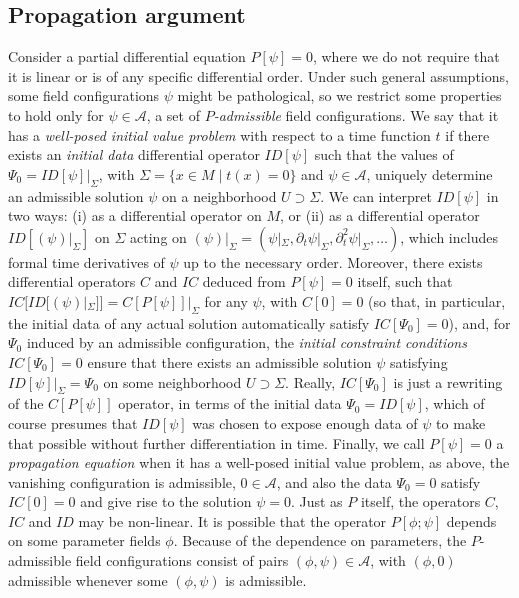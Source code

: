 \documentclass[a4paper]{article}
\theoremstyle{remark}
\newcommand{\del}{\partial}
\begin{document}
\subsection{Propagation argument} \label{sec:propeq}

Consider a partial differential equation $P[\psi] = 0$, where we do not
require that it is linear or is of any specific differential order.
Under such general assumptions, some field configurations $\psi$ might
be pathological, so we restrict some properties to hold only for $\psi
\in \mathcal{A}$, a set of \emph{$P$-admissible} field configurations.
We say that it has a \emph{well-posed initial value problem} with
respect to a time function $t$ if there exists an \emph{initial data}
differential operator $ID[\psi]$ such that the values of $\Psi_0 =
ID[\psi]|_\Sigma$, with $\Sigma = \{ x\in M \mid t(x) = 0 \}$ and $\psi
\in \mathcal{A}$, uniquely determine an admissible solution $\psi$ on a
neighborhood $U \supset \Sigma$. We can interpret $ID[\psi]$ in two
ways: (i) as a differential operator on $M$, or (ii) as a differential
operator $ID[(\psi)|_\Sigma]$ on $\Sigma$ acting on $(\psi)|_\Sigma =
(\psi|_\Sigma, \del_t \psi|_\Sigma, \del_t^2 \psi|_\Sigma, \ldots)$,
which includes formal time derivatives of $\psi$ up to the necessary
order. Moreover, there exists differential operators $C$ and $IC$
deduced from $P[\psi] = 0$ itself, such that $IC[ID[(\psi)|_\Sigma]] =
C[P[\psi]]|_\Sigma$ for any $\psi$, with $C[0] = 0$ (so that, in
particular, the initial data of any actual solution automatically
satisfy $IC[\Psi_0] = 0$), and, for $\Psi_0$ induced by an admissible
configuration, the \emph{initial constraint conditions} $IC[\Psi_0] = 0$
ensure that there exists an admissible solution $\psi$ satisfying
$ID[\psi]|_\Sigma = \Psi_0$ on some neighborhood $U \supset \Sigma$.
Really, $IC[\Psi_0]$ is just a rewriting of the $C[P[\psi]]$ operator,
in terms of the initial data $\Psi_0 = ID[\psi]$, which of course
presumes that $ID[\psi]$ was chosen to expose enough data of $\psi$ to
make that possible without further differentiation in time. Finally, we
call $P[\psi] = 0$ a \emph{propagation equation} when it has a
well-posed initial value problem, as above, the vanishing configuration
is admissible, $0 \in \mathcal{A}$, and also the data $\Psi_0 = 0$
satisfy $IC[0] = 0$ and give rise to the solution $\psi = 0$. Just as
$P$ itself, the operators $C$, $IC$ and $ID$ may be non-linear. It is
possible that the operator $P[\phi;\psi]$ depends on some parameter
fields $\phi$. Because of the dependence on parameters, the
$P$-admissible field configurations consist of pairs $(\phi, \psi) \in
\mathcal{A}$, with $(\phi,0)$ admissible whenever some $(\phi,\psi)$ is
admissible.
\end{document}
